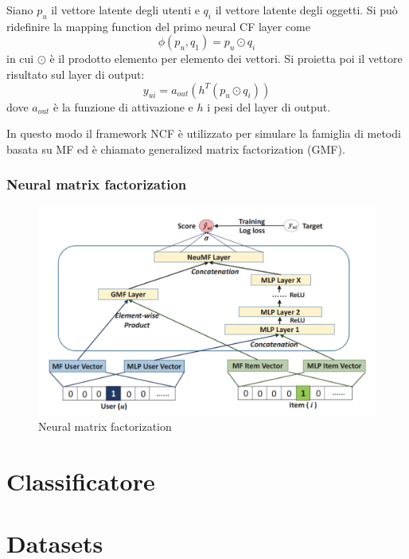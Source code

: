 \documentclass[12pt,italian]{report}
\begin{document}
Siano $p_u$ il vettore latente degli utenti e $q_i$ il vettore latente degli oggetti. Si può ridefinire la mapping function del primo neural CF layer come
$$
\phi(p_u, q_1) = p_u \odot q_i
$$
in cui $\odot$ è il prodotto elemento per elemento dei vettori. Si proietta poi il vettore risultato sul layer di output:
$$
y_{ui} = a_{out}(h^T(p_u \odot q_i))
$$
dove $a_{out}$ è la funzione di attivazione e $h$ i pesi del layer di output.

In questo modo il framework NCF è utilizzato per simulare la famiglia di metodi basata su MF ed è chiamato generalized matrix factorization (GMF).

\subsection{Neural matrix factorization}

\begin{figure}
  \includegraphics[width=\linewidth]{immagini/neumf.png}
  \caption{Neural matrix factorization}
  \label{fig:neumf}
\end{figure}

% 
% 

\chapter{Classificatore}
\label{chap:classificatore}



% 
% 

\chapter{Datasets}
\label{chap:datasets}
\end{document}
